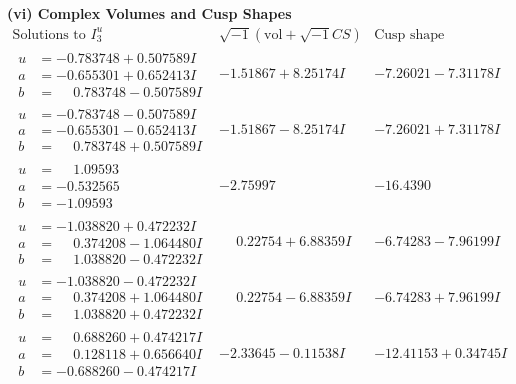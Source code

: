 \documentclass[1p]{elsarticle_modified}
\theoremstyle{definition}
\newcommand{\I}{\sqrt{-1}}
\begin{document}
\newpage\flushleft \textbf{(vi) Complex Volumes and Cusp Shapes}
$$\begin{array}{c|c|c}  
\text{Solutions to }I^u_{3}& \I (\text{vol} + \sqrt{-1}CS) & \text{Cusp shape}\\
 \hline 
\begin{aligned}
u &= -0.783748 + 0.507589 I \\
a &= -0.655301 + 0.652413 I \\
b &= \phantom{-}0.783748 - 0.507589 I\end{aligned}
 & -1.51867 + 8.25174 I & -7.26021 - 7.31178 I \\ \hline\begin{aligned}
u &= -0.783748 - 0.507589 I \\
a &= -0.655301 - 0.652413 I \\
b &= \phantom{-}0.783748 + 0.507589 I\end{aligned}
 & -1.51867 - 8.25174 I & -7.26021 + 7.31178 I \\ \hline\begin{aligned}
u &= \phantom{-}1.09593\phantom{ +0.000000I} \\
a &= -0.532565\phantom{ +0.000000I} \\
b &= -1.09593\phantom{ +0.000000I}\end{aligned}
 & -2.75997\phantom{ +0.000000I} & -16.4390\phantom{ +0.000000I} \\ \hline\begin{aligned}
u &= -1.038820 + 0.472232 I \\
a &= \phantom{-}0.374208 - 1.064480 I \\
b &= \phantom{-}1.038820 - 0.472232 I\end{aligned}
 & \phantom{-}0.22754 + 6.88359 I & -6.74283 - 7.96199 I \\ \hline\begin{aligned}
u &= -1.038820 - 0.472232 I \\
a &= \phantom{-}0.374208 + 1.064480 I \\
b &= \phantom{-}1.038820 + 0.472232 I\end{aligned}
 & \phantom{-}0.22754 - 6.88359 I & -6.74283 + 7.96199 I \\ \hline\begin{aligned}
u &= \phantom{-}0.688260 + 0.474217 I \\
a &= \phantom{-}0.128118 + 0.656640 I \\
b &= -0.688260 - 0.474217 I\end{aligned}
 & -2.33645 - 0.11538 I & -12.41153 + 0.34745 I \\ \hline\begin{aligned}

\end{aligned}
\end{array}$$
\end{document}
